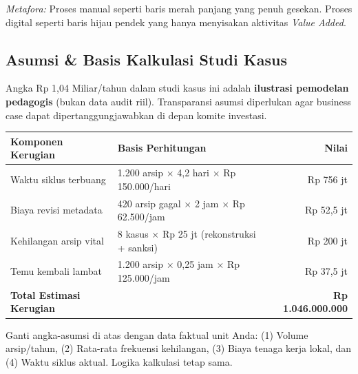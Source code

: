 \documentclass[11pt,a4paper]{article}
\begin{document}
\textit{Metafora:} Proses manual seperti baris merah panjang yang penuh gesekan. Proses digital seperti baris hijau pendek yang hanya menyisakan aktivitas \textit{Value Added}.

\subsection{Asumsi \& Basis Kalkulasi Studi Kasus}
Angka Rp 1,04 Miliar/tahun dalam studi kasus ini adalah \textbf{ilustrasi pemodelan pedagogis} (bukan data audit riil). Transparansi asumsi diperlukan agar business case dapat dipertanggungjawabkan di depan komite investasi.

\begin{table}[h!]
\centering\small
\begin{tabularx}{\textwidth}{@{} X X r @{}}
\toprule
\textbf{Komponen Kerugian} & \textbf{Basis Perhitungan} & \textbf{Nilai} \\
\midrule
\rowcolor{plnblue!5}
Waktu siklus terbuang & 1.200 arsip $\times$ 4,2 hari $\times$ Rp 150.000/hari & Rp 756 jt \\
Biaya revisi metadata & 420 arsip gagal $\times$ 2 jam $\times$ Rp 62.500/jam & Rp 52,5 jt \\
\rowcolor{plnblue!5}
Kehilangan arsip vital & 8 kasus $\times$ Rp 25 jt (rekonstruksi + sanksi) & Rp 200 jt \\
Temu kembali lambat & 1.200 arsip $\times$ 0,25 jam $\times$ Rp 125.000/jam & Rp 37,5 jt \\
\midrule
\textbf{Total Estimasi Kerugian} & & \textbf{Rp 1.046.000.000} \\
\bottomrule
\end{tabularx}
\end{table}

\begin{standardbox}
Ganti angka-asumsi di atas dengan data faktual unit Anda: (1) Volume arsip/tahun, (2) Rata-rata frekuensi kehilangan, (3) Biaya tenaga kerja lokal, dan (4) Waktu siklus aktual. Logika kalkulasi tetap sama.
\end{standardbox}
\end{document}
